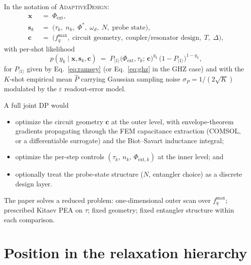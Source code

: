 \documentclass[11pt,a4paper]{article}
\begin{document}
In the notation of \textsc{AdaptiveDesign}:
\begin{align}
  \bm{x} &\;=\; \Phi_\text{ext},\\
  \bm{s}_k &\;=\; \bigl(\tau_k,\;n_k,\;\Phi^*,\;\omega_d,\;N,\;\text{probe state}\bigr),\\
  \bm{c} &\;=\; \bigl(f_q^{\max},\;\text{circuit geometry},\;\text{coupler/resonator design},\;T,\;\Delta\bigr),
\end{align}
with per-shot likelihood
\begin{equation}
  p(y_k\mid\bm{x},\bm{s}_k,\bm{c}) \;=\; P_{|1\rangle}\bigl(\Phi_\text{ext},\tau_k;\,\bm{c}\bigr)^{y_k}\,\bigl(1-P_{|1\rangle}\bigr)^{1-y_k},
\end{equation}
for $P_{|1\rangle}$ given by Eq.~\eqref{eq:ramsey} (or Eq.~\eqref{eq:ghz} in the GHZ case) and with the $K$-shot empirical mean $\hat P$ carrying Gaussian sampling noise $\sigma_P = 1/(2\sqrt{K})$ modulated by the $\varepsilon$ readout-error model.

A full joint DP would
\begin{itemize}[nosep,leftmargin=2em]
  \item optimize the circuit geometry $\bm{c}$ at the outer level, with envelope-theorem gradients propagating through the FEM capacitance extraction (COMSOL, or a differentiable surrogate) and the Biot--Savart inductance integral;
  \item optimize the per-step controls $(\tau_k,\,n_k,\,\Phi_{\text{ext},k})$ at the inner level; and
  \item optionally treat the probe-state structure ($N$, entangler choice) as a discrete design layer.
\end{itemize}
The paper solves a reduced problem: one-dimensional outer scan over $f_q^{\max}$; prescribed Kitaev PEA on $\tau$; fixed geometry; fixed entangler structure within each comparison.

\section{Position in the relaxation hierarchy}
\end{document}
